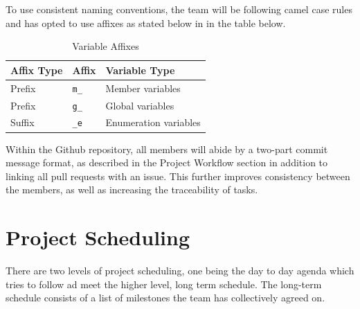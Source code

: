 \documentclass{article}
\begin{document}
To use consistent naming conventions, the team will be following camel case rules and has opted to use affixes as stated below in in the table below.

\begin{table}[h]
\begin{center}
    

\caption {Variable Affixes} \label{tab:title}

\begin{tabular}{ | m{4cm} | m{4cm} | m{4cm} |} 


    \hline
     Affix Type & Affix & Variable Type\\ 
 
    \hline
     Prefix & \texttt{m\_}& Member variables\\ 

    \hline
     Prefix & \texttt{g\_} & Global variables\\
     
     \hline
     Suffix & \texttt{\_e} & Enumeration variables\\
     
     \hline
\end{tabular}
\end{center}
\end{table}


Within the Github repository, all members will abide by a two-part commit message format, as described in the Project Workflow section in addition to linking all pull requests with an issue. This further improves consistency between the members, as well as increasing the traceability of tasks.








\section{Project Scheduling}
There are two levels of project scheduling, one being the day to day agenda which tries to follow ad meet the higher level, long term schedule. The long-term schedule consists of a  list of milestones the team has collectively agreed on. 
\end{document}
